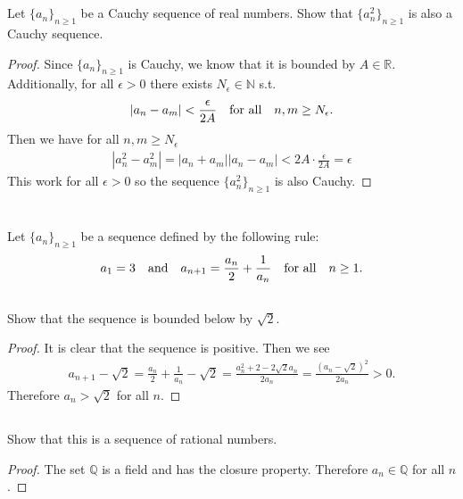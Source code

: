 \documentclass[11pt,letterpaper]{article}
\begin{document}
\section{}
Let $\{a_n\}_{n\geq 1}$ be a Cauchy sequence of real numbers. Show that
$\{a_n^2\}_{n\geq 1}$ is also a Cauchy sequence.

\begin{proof}
Since $\{a_n\}_{n\geq 1}$ is Cauchy, we know that it is bounded by $A\in\mathbb{R}$. Additionally, for all $\epsilon>0$ there exists $N_{\epsilon}\in \mathbb{N}$ s.t.
\begin{align*}
    |a_n-a_m|<\frac{\epsilon}{2A} \quad \mbox{for all} \quad n,m\geq N_\epsilon.
\end{align*}
Then we have for all $n,m \geq N_{\epsilon}$
\begin{align*}
    |a_n^2-a_m^2|=|a_n+a_m||a_n-a_m|< 2A\cdot \frac{\epsilon}{2A} = \epsilon
\end{align*}
This work for all $\epsilon>0$ so the sequence $\{a_n^2\}_{n\geq 1}$ is also Cauchy. 
\end{proof}

\section{}
Let $\{a_n\}_{n\geq 1}$ be a sequence defined by the following rule:
\begin{align}
    a_1 = 3 \quad \mbox{and} \quad a_{n+1}=\frac{a_n}{2}+\frac{1}{a_n} \quad \mbox{for all} \quad n\geq 1.
\end{align}

\subsection{} Show that the sequence is bounded below by $\sqrt{2}$.
\begin{proof}
It is clear that the sequence is positive. Then we see 
\begin{align*}
    a_{n+1}-\sqrt{2} = \frac{a_n}{2}+\frac{1}{a_n}-\sqrt{2} = \frac{a_n^2+2-2\sqrt{2}a_n}{2a_n} = \frac{(a_n-\sqrt{2})^2}{2a_n} >0.
\end{align*}
Therefore $a_n>\sqrt{2}$ for all $n$.
\end{proof}

\subsection{} Show that this is a sequence of rational numbers.
\begin{proof}
The set $\mathbb{Q}$ is a field and has the closure property. Therefore $a_n\in\mathbb{Q}$ for all $n$.
\end{proof}
\end{document}
